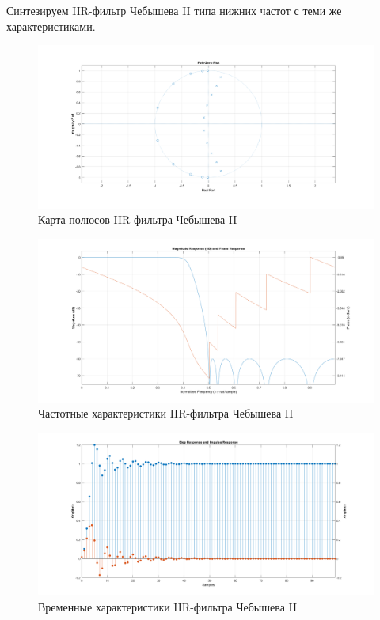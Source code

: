 \documentclass[12pt,a4paper]{article}
\begin{document}
	Синтезируем IIR-фильтр Чебышева II типа нижних частот с теми же характеристиками.
	
	\begin{figure}[H]
		\centering
		\includegraphics[width=1.0\linewidth]{res/5_cheb2_poles.png}
		\caption{Карта полюсов IIR-фильтра Чебышева II}
	\end{figure}
	
	\begin{figure}[H]
		\centering
		\includegraphics[width=1.0\linewidth]{res/5_cheb2_ach.png}
		\caption{Частотные характеристики IIR-фильтра Чебышева II}
	\end{figure}
	
	\begin{figure}[H]
		\centering
		\includegraphics[width=1.0\linewidth]{res/5_cheb2_time.png}
		\caption{Временные характеристики IIR-фильтра Чебышева II}
	\end{figure}
	
\end{document}
